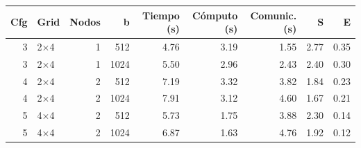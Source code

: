 \begin{tabular}{rlrrrrrrr}
\toprule
Cfg & Grid & Nodos & b & Tiempo (s) & Cómputo (s) & Comunic. (s) & S & E \\
\midrule
3 & 2$\times$4 & 1 & 512 & 4.76 & 3.19 & 1.55 & 2.77 & 0.35 \\
3 & 2$\times$4 & 1 & 1024 & 5.50 & 2.96 & 2.43 & 2.40 & 0.30 \\
4 & 2$\times$4 & 2 & 512 & 7.19 & 3.32 & 3.82 & 1.84 & 0.23 \\
4 & 2$\times$4 & 2 & 1024 & 7.91 & 3.12 & 4.60 & 1.67 & 0.21 \\
5 & 4$\times$4 & 2 & 512 & 5.73 & 1.75 & 3.88 & 2.30 & 0.14 \\
5 & 4$\times$4 & 2 & 1024 & 6.87 & 1.63 & 4.76 & 1.92 & 0.12 \\
\bottomrule
\end{tabular}
